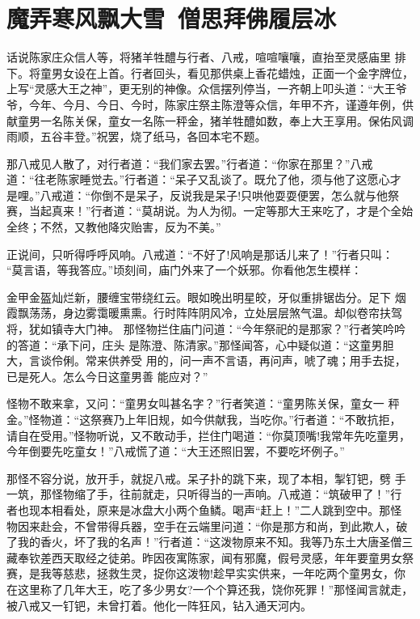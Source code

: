 \chapter{魔弄寒风飘大雪~僧思拜佛履层冰}

话说陈家庄众信人等，将猪羊牲醴与行者、八戒，喧喧嚷嚷，直抬至灵感庙里
排下。将童男女设在上首。行者回头，看见那供桌上香花蜡烛，正面一个金字牌位，
上写“灵感大王之神”，更无别的神像。众信摆列停当，一齐朝上叩头道：“大王爷
爷，今年、今月、今日、今时，陈家庄祭主陈澄等众信，年甲不齐，谨遵年例，供
献童男一名陈关保，童女一名陈一秤金，猪羊牲醴如数，奉上大王享用。保佑风调
雨顺，五谷丰登。”祝罢，烧了纸马，各回本宅不题。

那八戒见人散了，对行者道：“我们家去罢。”行者道：“你家在那里？”八戒
道：“往老陈家睡觉去。”行者道：“呆子又乱谈了。既允了他，须与他了这愿心才
是哩。”八戒道：“你倒不是呆子，反说我是呆子!只哄他耍耍便罢，怎么就与他祭
赛，当起真来！”行者道：“莫胡说。为人为彻。一定等那大王来吃了，才是个全始
全终；不然，又教他降灾贻害，反为不美。”

正说间，只听得呼呼风响。八戒道：“不好了!风响是那话儿来了！”行者只叫：
“莫言语，等我答应。”顷刻间，庙门外来了一个妖邪。你看他怎生模样：

金甲金盔灿烂新，腰缠宝带绕红云。眼如晚出明星皎，牙似重排锯齿分。足下
烟霞飘荡荡，身边雾霭暖熏熏。行时阵阵阴风冷，立处层层煞气温。却似卷帘扶驾
将，犹如镇寺大门神。
那怪物拦住庙门问道：“今年祭祀的是那家？”行者笑吟吟的答道：“承下问，庄头
是陈澄、陈清家。”那怪闻答，心中疑似道：“这童男胆大，言谈伶俐。常来供养受
用的，问一声不言语，再问声，唬了魂；用手去捉，已是死人。怎么今日这童男善
能应对？”

怪物不敢来拿，又问：“童男女叫甚名字？”行者笑道：“童男陈关保，童女一
秤金。”怪物道：“这祭赛乃上年旧规，如今供献我，当吃你。”行者道：“不敢抗拒，
请自在受用。”怪物听说，又不敢动手，拦住门喝道：“你莫顶嘴!我常年先吃童男，
今年倒要先吃童女！”八戒慌了道：“大王还照旧罢，不要吃坏例子。”

那怪不容分说，放开手，就捉八戒。呆子扑的跳下来，现了本相，掣钉钯，劈
手一筑，那怪物缩了手，往前就走，只听得当的一声响。八戒道：“筑破甲了！”行
者也现本相看处，原来是冰盘大小两个鱼鳞。喝声“赶上！”二人跳到空中。那怪
物因来赴会，不曾带得兵器，空手在云端里问道：“你是那方和尚，到此欺人，破
了我的香火，坏了我的名声！”行者道：“这泼物原来不知。我等乃东土大唐圣僧三
藏奉钦差西天取经之徒弟。昨因夜寓陈家，闻有邪魔，假号灵感，年年要童男女祭
赛，是我等慈悲，拯救生灵，捉你这泼物!趁早实实供来，一年吃两个童男女，你
在这里称了几年大王，吃了多少男女?一个个算还我，饶你死罪！”那怪闻言就走，
被八戒又一钉钯，未曾打着。他化一阵狂风，钻入通天河内。

